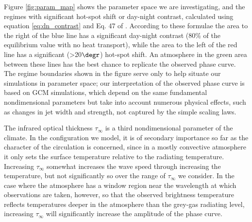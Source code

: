 Figure \ref{fig:param_map} shows  the parameter space we are investigating, and the regimes with significant hot-spot shift or day-night contrast, calculated using equation \ref{eq:dn_contrast} and Eq. 47 of \citet{zhang2016effects}. According to these formulae the area to the right of the blue line has a significant day-night contrast (80\% of the equilibrium value with no heat transport), while the area to the left of the red line has a significant (\textgreater20$\degr$) hot-spot shift. An atmosphere in the green area between these lines has the best chance to replicate the observed phase curve. The regime boundaries shown in the figure serve only to help situate our simulations in parameter space; our interpretation of the observed phase curve is based on GCM simulations, which depend on the same fundamental nondimensional parameters but take into account numerous physical effects, such as changes in jet width and strength, not captured by the simple scaling laws.

The infrared optical thickness $\tau_{\infty}$ is a third nondimensional parameter of the climate.  In the configuration we model, it is of secondary importance so far as the character of the circulation is concerned, since in a mostly convective atmosphere it only sets the surface temperature relative to the radiating temperature. Increasing $\tau_{\infty}$ somewhat increases the wave speed through increasing the temperature, but not significantly so over the range of $\tau_{\infty}$ we consider.  In the case where the atmosphere has a window region near the wavelength at which observations are taken, however, so that the observed brightness temperature reflects temperatures deeper in the atmosphere than the grey-gas radiating level, increasing $\tau_{\infty}$ will significantly increase the amplitude of the phase curve.




